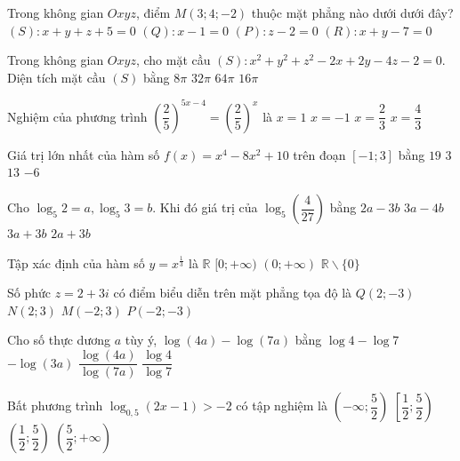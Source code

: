 \begin{ex}%
Trong không gian $O x y z$, điểm $M(3; 4;-2)$ thuộc mặt phẳng nào dưới dưới đây?
\choice
{$(S)\colon x+y+z+5=0$}
{$(Q)\colon x-1=0$}
{$(P)\colon z-2=0$}
{\True $(R)\colon x+y-7=0$}

\end{ex}
\begin{ex}%
Trong không gian $O x y z$, cho mặt cầu $(S)\colon x^2+y^2+z^2-2 x+  2 y-4 z-2=0$. Diện tích mặt cầu $(S)$ bằng
\choice
{$8\pi$}
{\True $32\pi$}
{$64\pi$}
{$16\pi$}

\end{ex}
\begin{ex}%
Nghiệm của phương trình $\left(\dfrac{2}{5}\right)^{5 x-4}=\left(\dfrac{2}{5}\right)^{x}$ là
\choice
{\True $x=1$}
{$x=-1$}
{$x=\dfrac{2}{3}$}
{$x=\dfrac{4}{3}$}

\end{ex}
\begin{ex}%
Giá trị lớn nhất của hàm số $f(x)=x^4-8 x^2+10$ trên đoạn $[-1; 3]$ bằng
\choice
{\True $19$}
{$3$}
{$13$}
{$-6$}

\end{ex}
\begin{ex}%
Cho $\log_5 2=a, \log_5 3=b$. Khi đó giá trị của $\log_5\left(\dfrac{4}{27}\right)$ bằng
\choice
{\True $2 a-3 b$}
{$3 a-4 b$}
{$3 a+3 b$}
{$2 a+3 b$}

\end{ex}
\begin{ex}%
Tập xác định của hàm số $y=x^{\frac{1}{3}}$ là
\choice
{$\mathbb{R}$}
{$[0;+\infty)$}
{\True $(0;+\infty)$}
{$\mathbb{R} \backslash\{0\}$}

\end{ex}
\begin{ex}%
Số phức $z=2+3 i$ có điểm biểu diễn trên mặt phẳng tọa độ là
\choice
{$Q(2;-3)$}
{\True $N(2; 3)$}
{$M(-2; 3)$}
{$P(-2;-3)$}

\end{ex}
\begin{ex}%
Cho số thực dương $a$ tùy ý, $\log (4 a)-\log (7 a)$ bằng
\choice
{\True $\log 4-\log 7$}
{$-\log (3 a)$}
{$\dfrac{\log (4 a)}{\log (7 a)}$}
{$\dfrac{\log 4}{\log 7}$}

\end{ex}
\begin{ex}%
Bất phương trình $\log_{0,5}(2 x-1)>-2$ có tập nghiệm là
\choice
{$\left(-\infty; \dfrac{5}{2}\right)$}
{$\left[\dfrac{1}{2}; \dfrac{5}{2}\right)$}
{\True $\left(\dfrac{1}{2}; \dfrac{5}{2}\right)$}
{$\left(\dfrac{5}{2};+\infty\right)$}

\end{ex}
